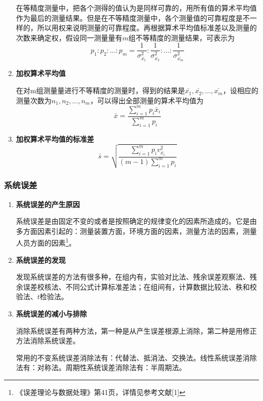 \begin{enumerate}
	\qquad 在等精度测量中，把各个测得的值认为是同样可靠的，用所有值的算术平均值作为最后的测量结果。但是在不等精度测量中，各个测量值的可靠程度是不一样的，所以用权来说明测量的可靠程度。再根据算术平均值标准差以及测量的次数来确定权，假设同一测量量有$ m $组不等精度的测量结果，可表示为\[ p_1:p_2:...:p_m=\frac{1}{\sigma_{\bar{x_1}}^2}:\frac{1}{\sigma_{\bar{x_2}}^2}:...:\frac{1}{\sigma_{\bar{x_m}}^2} \]
	\item \textbf{加权算术平均值}
	
	\qquad 在对m组测量量进行不等精度的测量时，得到的结果是$ \bar{x_1},\bar{x_2},...,\bar{x_m} $，设相应的测量次数为$ n_1,n_2,...,n_m $，可以得出全部测量的算术平均值为\[ \bar{x}=\frac{\sum\limits_{i=1}^{m}p_i\bar{x}_i}{\sum\limits_{i=1}^{m}p_i} \]
	\item \textbf{加权算术平均值的标准差}\[ \bar{s}=\sqrt{\frac{\sum\limits_{i=1}^{m}p_iv_{\bar{x_i}}^2}{(m-1)\sum\limits_{i=1}^{m}p_i}} \]
\end{enumerate}
\subsubsection{系统误差}
\begin{enumerate}
	\item \textbf{系统误差的产生原因}
	
	\qquad 系统误差是由固定不变的或者是按照确定的规律变化的因素所造成的。它是由多方面因素引起的：测量装置方面，环境方面的因素，测量方法的因素，测量人员方面的因素\footnote{《误差理论与数据处理》第41页，详情见参考文献[1]}。
	\item \textbf{系统误差的发现}
	
	\qquad 发现系统误差的方法有很多种，在组内有，实验对比法、残余误差观察法、残余误差校核法、不同公式计算标准差法；在组间有，计算数据比较法、秩和校验法、$ t $检验法。
	\item \textbf{系统误差的减小与排除}
	
	\qquad 消除系统误差有两种方法，第一种是从产生误差根源上消除，第二种是用修正方法消除系统误差。
	
	\qquad 常用的不变系统误差消除法有：代替法、抵消法、交换法。线性系统误差消除法有：对称法。周期性系统误差消除法有：半周期法。
\end{enumerate}
